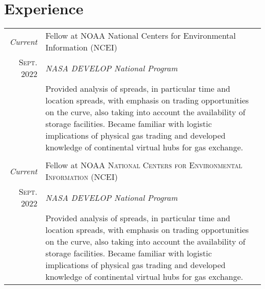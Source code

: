 \section{Experience}

\setlength{\arrayrulewidth}{.01pt}
\setlength{\tabcolsep}{8pt}
    
\begin{tabular}{r|p{15cm}}	
    \emph{Current} 
    & Fellow at {NOAA National Centers for Environmental Information (NCEI)} \\
    \textsc{Sept. 2022}
    &\emph{NASA DEVELOP National Program}\\
    &\footnotesize{Provided analysis of spreads, in particular time and location spreads, with emphasis on trading opportunities on the curve, also taking into account the availability of storage facilities. Became familiar with logistic implications of physical gas trading and developed knowledge of continental virtual hubs for gas exchange.}\\\multicolumn{2}{c}{} \\

 \emph{Current} 
    & Fellow at \textsc{NOAA National Centers for Environmental Information (NCEI)} \\
    \textsc{Sept. 2022}
    &\emph{NASA DEVELOP National Program}\\
    &\footnotesize{Provided analysis of spreads, in particular time and location spreads, with emphasis on trading opportunities on the curve, also taking into account the availability of storage facilities. Became familiar with logistic implications of physical gas trading and developed knowledge of continental virtual hubs for gas exchange.}
\end{tabular}


